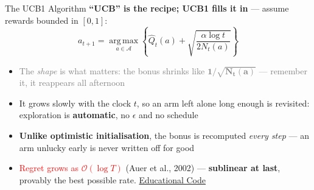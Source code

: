 \begin{frame}{The UCB1 Algorithm}
\textbf{``UCB'' is the recipe; UCB1 fills it in} --- assume rewards bounded in $[0,1]$:
\[
    a_{t+1} = \operatorname*{arg\,max}_{a \in \mathcal{A}} \left\{ \hat{Q}_t(a) + \sqrt{\frac{\alpha \log t}{2 N_t(a)}} \right\}
\]
\begin{itemize}
    \setlength{\itemsep}{0.5em}
    \item \textcolor{gray}{The \emph{shape} is what matters: the bonus shrinks like $\mathbf{1/\sqrt{N_t(a)}}$ --- remember it, it reappears all afternoon}
    \item It grows slowly with the clock $t$, so an arm left alone long enough is revisited: exploration is \textbf{automatic}, no $\epsilon$ and no schedule
    \item \textbf{Unlike optimistic initialisation}, the bonus is recomputed \emph{every step} --- an arm unlucky early is never written off for good
    \item \textcolor{red}{Regret grows as $\mathcal{O}(\log T)$} (Auer et al., 2002) --- \textbf{sublinear at last}, provably the best possible rate. \href{https://github.com/TikhonJelvis/RL-book/tree/master/rl/chapter14/ucb1.py}{Educational Code}
\end{itemize}
\end{frame}

